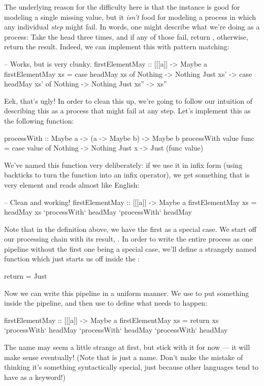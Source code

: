The underlying reason for the difficulty here is that the  instance is good for
modeling a single missing value, but it \emph{isn't} food for modeling a process in which any
individual \emph{step} might fail. In words, one might describe what we're doing as a process:
Take the head three times, and if any of those fail, return , otherwise, return
 the result. Indeed, we can implement this with pattern matching:
\begin{haskell}
-- Works, but is very clunky.
firstElementMay :: [[[a]] -> Maybe a
firstElementMay xs = case headMay xs of
  Nothing -> Nothing
  Just xs' -> case headMay xs' of
    Nothing -> Nothing
    Just xs'' -> xs''
\end{haskell}
Eek, that's ugly! In order to clean this up, we're going to follow our intuition of describing this
as a process that might fail at any step. Let's implement this as the following function:
\begin{haskell}
processWith :: Maybe a -> (a -> Maybe b) -> Maybe b
processWith value func =
  case value of
    Nothing -> Nothing
    Just x -> Just (func value)
\end{haskell}

We've named this function very deliberately: if we use it in infix form (using backticks to turn the
function into an infix operator), we get something that is very element and reads almost like
English:
\begin{haskell}
-- Clean and working!
firstElementMay :: [[[a]] -> Maybe a
firstElementMay xs =
  headMay xs `processWith` headMay `processWith` headMay
\end{haskell}

Note that in the definition above, we have the first  as a special case. We start
off our processing chain with its result, . In order to write the entire process
as one pipeline without the first one being a special case, we'll define a strangely named
 function which just starts us off inside the :
\begin{haskell}
return = Just
\end{haskell}
Now we can write this pipeline in a uniform manner. We use  to put something inside
the pipeline, and then use  to define what needs to happen:
\begin{haskell}
firstElementMay :: [[[a]] -> Maybe a
firstElementMay xs =
  return xs `processWith` headMay 
            `processWith` headMay
            `processWith` headMay
\end{haskell}
The name  may seem a little strange at first, but stick with it for now --- it will
make sense eventually! (Note that  is just a name. Don't make the mistake of thinking
it's something syntactically special, just because other languages tend to have  as a
keyword!)

